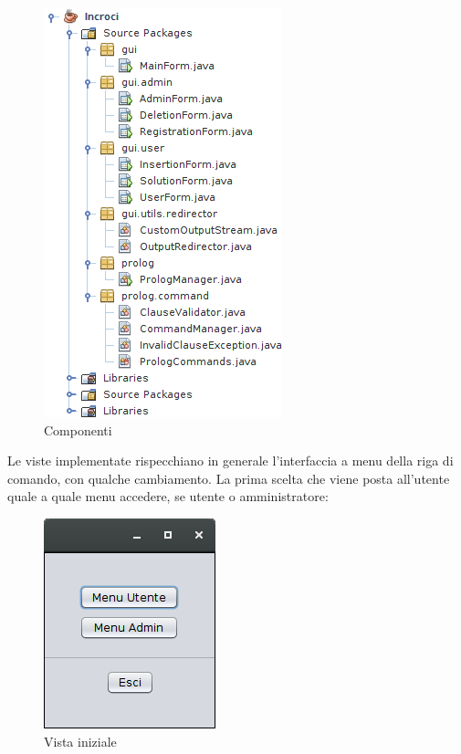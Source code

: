 \begin{figure}[!htbp]
	\centering
	\includegraphics[width=.4\textwidth]{images/java}
	\caption{Componenti}
\end{figure}

\clearpage
Le viste implementate rispecchiano in generale l'interfaccia a menu della riga di comando, con qualche cambiamento. La prima scelta che viene posta all'utente quale a quale menu accedere, se utente o amministratore:

\begin{figure}[!htbp]
	\centering
	\includegraphics[width=.3\textwidth]{images/menu_gui}
	\caption{Vista iniziale}
\end{figure}

